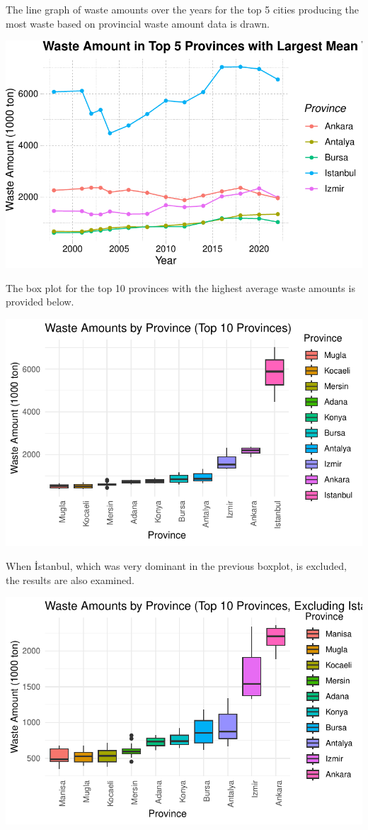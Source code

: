 \documentclass[
  11pt,
  a4paper,
  DIV=11,
  numbers=noendperiod]{scrartcl}
\begin{document}
The line graph of waste amounts over the years for the top 5 cities
producing the most waste based on provincial waste amount data is drawn.

\includegraphics{project_files/figure-pdf/unnamed-chunk-25-1.pdf}

The box plot for the top 10 provinces with the highest average waste
amounts is provided below.

\includegraphics{project_files/figure-pdf/unnamed-chunk-26-1.pdf}

When İstanbul, which was very dominant in the previous boxplot, is
excluded, the results are also examined.

\includegraphics{project_files/figure-pdf/unnamed-chunk-27-1.pdf}
\end{document}
